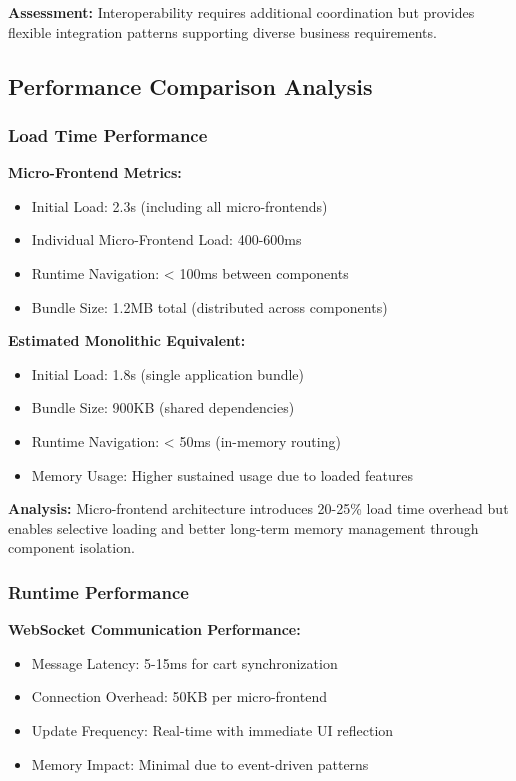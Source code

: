 \documentclass[12pt,a4paper]{report}
\begin{document}
\textbf{Assessment:} Interoperability requires additional coordination but provides flexible integration patterns supporting diverse business requirements.

\subsection{Performance Comparison Analysis}

\subsubsection{Load Time Performance}

\textbf{Micro-Frontend Metrics:}
\begin{itemize}
\item Initial Load: 2.3s (including all micro-frontends)
\item Individual Micro-Frontend Load: 400-600ms
\item Runtime Navigation: < 100ms between components
\item Bundle Size: 1.2MB total (distributed across components)
\end{itemize}

\textbf{Estimated Monolithic Equivalent:}
\begin{itemize}
\item Initial Load: 1.8s (single application bundle)
\item Bundle Size: 900KB (shared dependencies)
\item Runtime Navigation: < 50ms (in-memory routing)
\item Memory Usage: Higher sustained usage due to loaded features
\end{itemize}

\textbf{Analysis:} Micro-frontend architecture introduces 20-25\% load time overhead but enables selective loading and better long-term memory management through component isolation.

\subsubsection{Runtime Performance}

\textbf{WebSocket Communication Performance:}
\begin{itemize}
\item Message Latency: 5-15ms for cart synchronization
\item Connection Overhead: 50KB per micro-frontend
\item Update Frequency: Real-time with immediate UI reflection
\item Memory Impact: Minimal due to event-driven patterns
\end{itemize}
\end{document}
